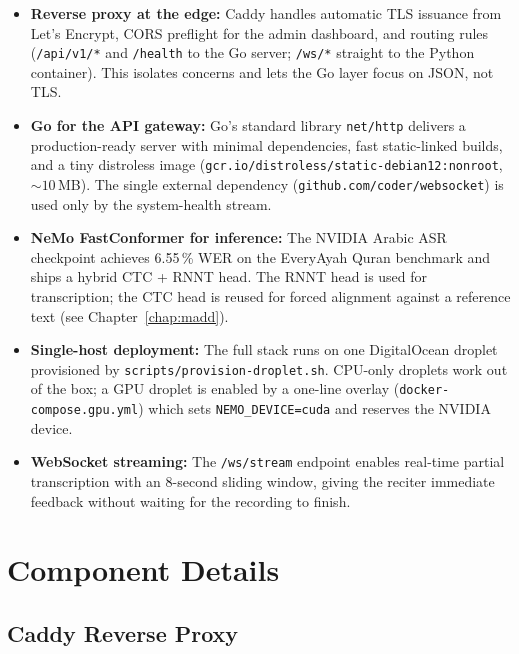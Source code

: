 \begin{itemize}
    \item \textbf{Reverse proxy at the edge:} Caddy handles automatic TLS issuance from Let's Encrypt, CORS preflight for the admin dashboard, and routing rules (\texttt{/api/v1/*} and \texttt{/health} to the Go server; \texttt{/ws/*} straight to the Python container). This isolates concerns and lets the Go layer focus on JSON, not TLS.
    \item \textbf{Go for the API gateway:} Go's standard library \texttt{net/http} delivers a production-ready server with minimal dependencies, fast static-linked builds, and a tiny distroless image (\texttt{gcr.io/distroless/static-debian12:nonroot}, ${\sim}10$\,MB). The single external dependency (\texttt{github.com/coder/websocket}) is used only by the system-health stream.
    \item \textbf{NeMo FastConformer for inference:} The NVIDIA Arabic ASR checkpoint achieves 6.55\,\% WER on the EveryAyah Quran benchmark and ships a hybrid CTC + RNNT head. The RNNT head is used for transcription; the CTC head is reused for forced alignment against a reference text (see Chapter~\ref{chap:madd}).
    \item \textbf{Single-host deployment:} The full stack runs on one DigitalOcean droplet provisioned by \texttt{scripts/provision-droplet.sh}. CPU-only droplets work out of the box; a GPU droplet is enabled by a one-line overlay (\texttt{docker-compose.gpu.yml}) which sets \texttt{NEMO\_DEVICE=cuda} and reserves the NVIDIA device.
    \item \textbf{WebSocket streaming:} The \texttt{/ws/stream} endpoint enables real-time partial transcription with an 8-second sliding window, giving the reciter immediate feedback without waiting for the recording to finish.
\end{itemize}

\chapter{Component Details}

\section{Caddy Reverse Proxy}
\label{sec:caddy}

